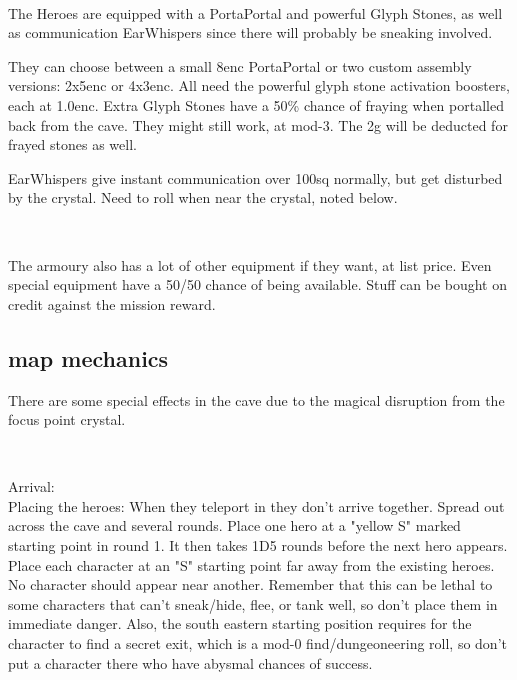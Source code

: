 \

\noindent
The Heroes are equipped with a PortaPortal and powerful Glyph Stones, as well as communication EarWhispers since there will probably be sneaking involved.

They can choose between a small 8enc PortaPortal or two custom assembly versions: 2x5enc or 4x3enc. All need the powerful glyph stone activation boosters, each at 1.0enc. Extra Glyph Stones have a 50\% chance of fraying when portalled back from the cave. They might still work, at mod-3. The 2g will be deducted for frayed stones as well.

EarWhispers give instant communication over 100sq normally, but get disturbed by the crystal. Need to roll when near the crystal, noted below.

\

The armoury also has a lot of other equipment if they want, at list price. Even special equipment have a 50/50 chance of being available. Stuff can be bought on credit against the mission reward.





\subsection*{map mechanics}
There are some special effects in the cave due to the magical disruption from the focus point crystal.

\

Arrival:\\
Placing the heroes: When they teleport in they don't arrive together. Spread out across the cave and several rounds. Place one hero at a "yellow S" marked starting point in round 1. It then takes 1D5 rounds before the next hero appears. Place each character at an "S" starting point far away from the existing heroes. No character should appear near another.
Remember that this can be lethal to some characters that can't sneak/hide, flee, or tank well, so don't place them in immediate danger. Also, the south eastern starting position requires for the character to find a secret exit, which is a mod-0 find/dungeoneering roll, so don't put a character there who have abysmal chances of success.


